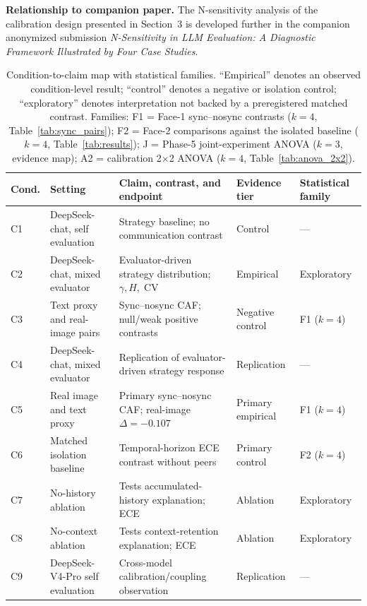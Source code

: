 \documentclass[11pt]{article}
\DeclareMathOperator{\CV}{CV}
\begin{document}
\noindent\textbf{Relationship to companion paper.} The N-sensitivity analysis of the calibration design presented in Section~3 is developed further in the companion anonymized submission \emph{N-Sensitivity in LLM Evaluation: A Diagnostic Framework Illustrated by Four Case Studies}.

\begin{table}[t]
\centering
\caption{Condition-to-claim map with statistical families. ``Empirical'' denotes an observed condition-level result; ``control'' denotes a negative or isolation control; ``exploratory'' denotes interpretation not backed by a preregistered matched contrast. Families: F1 = Face-1 sync--nosync contrasts ($k{=}4$, Table~\ref{tab:sync_pairs}); F2 = Face-2 comparisons against the isolated baseline ($k{=}4$, Table~\ref{tab:results}); J = Phase-5 joint-experiment ANOVA ($k{=}3$, evidence map); A2 = calibration 2$\times$2 ANOVA ($k{=}4$, Table~\ref{tab:anova_2x2}).}
\label{tab:cond-overview}
\small
\begin{tabularx}{\textwidth}{@{}l p{} X p{} p{}@{}}
\toprule
\textbf{Cond.} & \textbf{Setting} & \textbf{Claim, contrast, and endpoint} & \textbf{Evidence tier} & \textbf{Statistical family} \\
\midrule
C1 & DeepSeek-chat, self evaluation & Strategy baseline; no communication contrast & Control & --- \\
C2 & DeepSeek-chat, mixed evaluator & Evaluator-driven strategy distribution; $\gamma,H,\CV$ & Empirical & Exploratory \\
C3 & Text proxy and real-image pairs & Sync--nosync CAF; null/weak positive contrasts & Negative control & F1 ($k{=}4$) \\
C4 & DeepSeek-chat, mixed evaluator & Replication of evaluator-driven strategy response & Replication & --- \\
C5 & Real image and text proxy & Primary sync--nosync CAF; real-image $\Delta=-0.107$ & Primary empirical & F1 ($k{=}4$) \\
C6 & Matched isolation baseline & Temporal-horizon ECE contrast without peers & Primary control & F2 ($k{=}4$) \\
C7 & No-history ablation & Tests accumulated-history explanation; ECE & Ablation & Exploratory \\
C8 & No-context ablation & Tests context-retention explanation; ECE & Ablation & Exploratory \\
C9 & DeepSeek-V4-Pro self evaluation & Cross-model calibration/coupling observation & Replication & --- \\

\end{tabularx}
\end{table}
\end{document}
